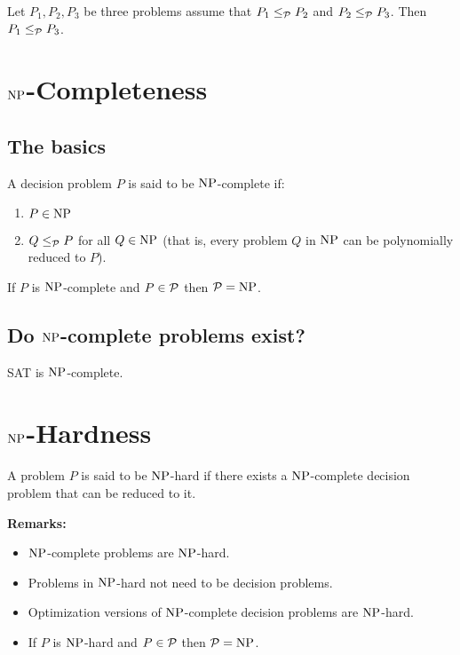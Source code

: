 \documentclass[../open-optimization/open-optimization.tex]{subfiles}
\begin{document}
\begin{proposition} Let $P_1,P_2,P_3$ be three problems assume that $P_1\leq_{{\mathcal{P}}}P_2$ and $P_2\leq_{{\mathcal{P}}}P_3$. Then $P_1\leq_{{\mathcal{P}}}P_3$.
\end{proposition}

\section{$\NP$-Completeness}
\subsection{The basics}
\begin{definition}[$\NP$-Completeness]
A decision problem $P$ is said to be $\NP$-complete if:
\begin{enumerate}
	\item $P\in \text{NP}$
	\item $Q\leq_{{\mathcal{P}}}P$ for all $Q\in\text{NP}$ (that is, every problem $Q$ in $\NP$ can be polynomially reduced to $P$). 
\end{enumerate}
\end{definition}

\begin{proposition} If $P$ is $\NP$-complete and $P\in{\mathcal{P}}$ then ${\mathcal{P}}=\text{NP}$.
\end{proposition}
\subsection{Do $\NP$-complete problems  exist?}
\begin{theorem}[S. Cook, 1971]
SAT is $\NP$-complete.  
\end{theorem}
\section{$\NP$-Hardness}
\begin{definition}[$\NP$-Completeness]
A problem $P$ is said to be $\NP$-hard if there exists a $\NP$-complete decision problem that can be reduced to it. 
\end{definition}

{\bf Remarks:}
\begin{itemize}
	\item $\NP$-complete problems are $\NP$-hard.
	\item Problems in $\NP$-hard not need to be decision problems.
	\item Optimization versions of $\NP$-complete decision problems are $\NP$-hard.
	\item If $P$ is $\NP$-hard and $P\in{\mathcal{P}}$ then ${\mathcal{P}}=\text{NP}$.
\end{itemize}
\end{document}
